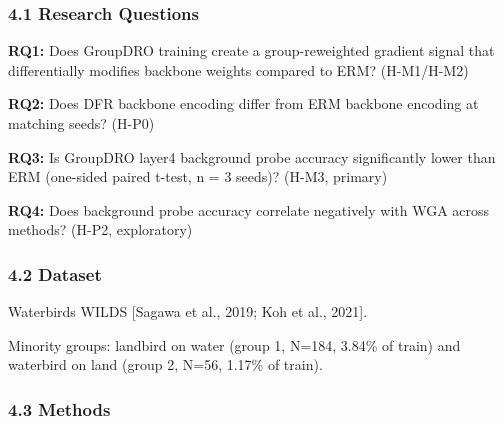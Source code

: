 
\subsubsection{4.1 Research Questions}

\textbf{RQ1:} Does GroupDRO training create a group-reweighted gradient signal that differentially modifies backbone weights compared to ERM? (H-M1/H-M2)

\textbf{RQ2:} Does DFR backbone encoding differ from ERM backbone encoding at matching seeds? (H-P0)

\textbf{RQ3:} Is GroupDRO layer4 background probe accuracy significantly lower than ERM (one-sided paired t-test, n = 3 seeds)? (H-M3, primary)

\textbf{RQ4:} Does background probe accuracy correlate negatively with WGA across methods? (H-P2, exploratory)

\subsubsection{4.2 Dataset}

Waterbirds WILDS [Sagawa et al., 2019; Koh et al., 2021].

\begin{table}[htbp]
\centering
{}
\end{table}

Minority groups: landbird on water (group 1, N=184, 3.84\% of train) and waterbird on land (group 2, N=56, 1.17\% of train).

\subsubsection{4.3 Methods}

\begin{table}[htbp]
\centering
{}
\end{table}

